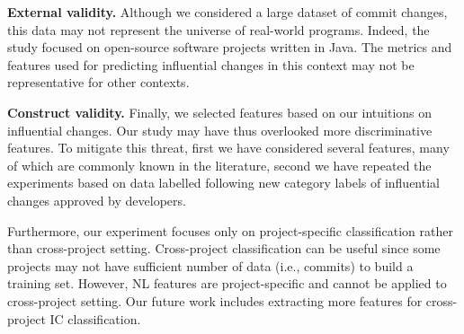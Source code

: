 

\textbf{External validity.} Although we considered a large dataset of commit
changes, this data may not represent the universe of real-world programs.
Indeed, the study focused on open-source software projects written in Java.
The metrics and features used for predicting influential changes in this context
may not be representative for other contexts.


\textbf{Construct validity.} Finally, we selected features based on
our intuitions on influential changes. Our study may have thus overlooked more
discriminative features. To mitigate this threat, first we have considered several
features, many of which are commonly known in the literature, second we have repeated
the experiments based on data labelled following  new category labels of influential changes
approved by developers. 

Furthermore, our experiment focuses only on project-specific classification rather than cross-project setting. Cross-project classification can be useful since some projects may not have sufficient number of data (i.e., commits) to build a training set. However, NL features are project-specific and cannot be
applied to cross-project setting. 
Our future work includes extracting more features for cross-project IC classification.
